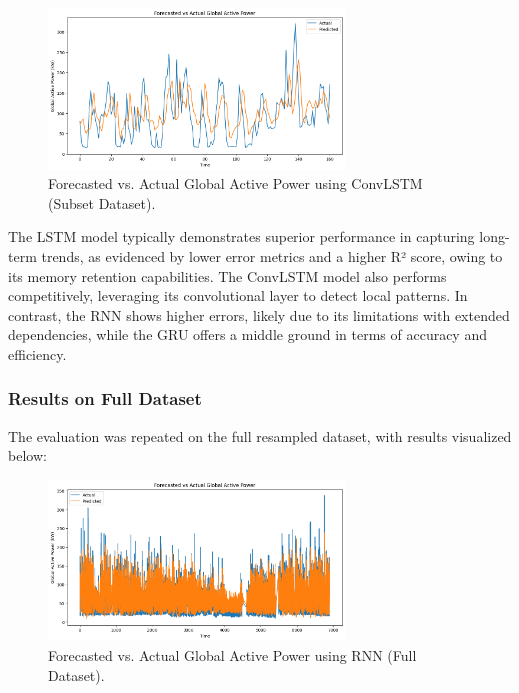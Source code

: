 	\begin{figure}[h]
		\centering
		\includegraphics[width=0.7\textwidth]{./figures_aman/path_to_convlstm_subset_plot.png}
		\caption{Forecasted vs. Actual Global Active Power using ConvLSTM (Subset Dataset).}
		\label{fig:convlstm_subset}
	\end{figure}
	
	The LSTM model typically demonstrates superior performance in capturing long-term trends, as evidenced by lower error metrics and a higher R² score, owing to its memory retention capabilities. The ConvLSTM model also performs competitively, leveraging its convolutional layer to detect local patterns. In contrast, the RNN shows higher errors, likely due to its limitations with extended dependencies, while the GRU offers a middle ground in terms of accuracy and efficiency.
	
	\subsubsection{Results on Full Dataset}
	The evaluation was repeated on the full resampled dataset, with results visualized below:
	
	\begin{figure}[h]
		\centering
		\includegraphics[width=0.7\textwidth]{./figures_aman/path_to_rnn_full_plot.png}
		\caption{Forecasted vs. Actual Global Active Power using RNN (Full Dataset).}
		\label{fig:rnn_full}
	\end{figure}
	
